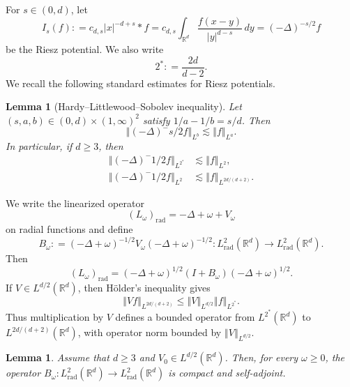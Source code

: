 \documentclass[12pt, a4paper, reqno]{amsart}
\numberwithin{equation}{section}
\newtheorem{lemma}[theorem]{Lemma}
\theoremstyle{definition}
\theoremstyle{remark}
\newcommand{\R}{\mathbb R}
\def\norm[#1]{{\left\Vert #1 \right\Vert}}
\newcommand{\rad}{\mathrm{rad}}
\newcommand{\ce}{\mathrel{\mathop:}=}
\begin{document}
For $s\in(0,d)$, let
\[
  I_s(f)
  \ce c_{d,s}|x|^{-d+s}*f
  =c_{d,s}\int_{\R^d}\frac{f(x-y)}{|y|^{d-s}}\,dy
  =(-\Delta)^{-s/2}f
\]
be the Riesz potential. We also write
\[
  2^*\ce\frac{2d}{d-2}.
\]
We recall the following standard estimates for Riesz potentials.
\begin{lemma}[Hardy--Littlewood--Sobolev inequality]
Let $(s,a,b)\in(0,d)\times(1,\infty)^2$ satisfy
$1/a-1/b=s/d$. Then
\begin{equation*}
  \norm[(-\Delta)^{-s/2}f]_{L^b}
  \lesssim \norm[f]_{L^a}.
\end{equation*}
In particular, if $d\ge3$, then
\begin{align*}
  \norm[(-\Delta)^{-1/2}f]_{L^{2^*}}
  &\lesssim \norm[f]_{L^2},
  \\
  \norm[(-\Delta)^{-1/2}f]_{L^2}
  &\lesssim \norm[f]_{L^{2d/(d+2)}}.
\end{align*}
\end{lemma}

We write the linearized operator
\[
  (L_\omega)_{\rad}=-\Delta+\omega+V_\omega
\]
on radial functions and define
\begin{equation*}
  B_\omega
  \ce(-\Delta+\omega)^{-1/2}
    V_\omega
    (-\Delta+\omega)^{-1/2}
  \colon L^2_{\rad}(\R^d)\to L^2_{\rad}(\R^d).
\end{equation*}
Then
\[
  (L_\omega)_{\rad}
  =(-\Delta+\omega)^{1/2}
    (I+B_\omega)
    (-\Delta+\omega)^{1/2}.
\]
If $V\in L^{d/2}(\R^d)$, then H\"older's inequality gives
\begin{equation*}
  \norm[Vf]_{L^{2d/(d+2)}}
  \le \norm[V]_{L^{d/2}}\norm[f]_{L^{2^*}}.
\end{equation*}
Thus multiplication by $V$ defines a bounded operator from
$L^{2^*}(\R^d)$ to $L^{2d/(d+2)}(\R^d)$, with operator norm bounded by
$\norm[V]_{L^{d/2}}$.

\begin{lemma}\label{lem:Kcomp}
Assume that $d\ge3$ and $V_0\in L^{d/2}(\R^d)$. Then, for every
$\omega\ge0$, the operator
$B_\omega\colon L^2_{\rad}(\R^d)\to L^2_{\rad}(\R^d)$ is compact and
self-adjoint.
\end{lemma}
\end{document}
